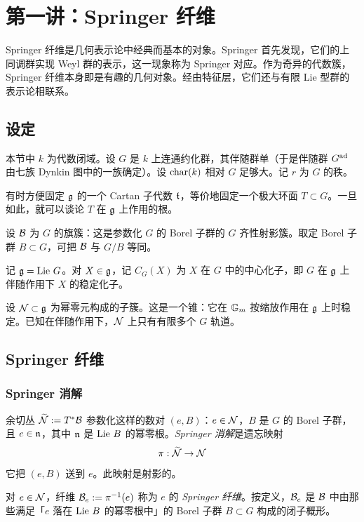 \section{第一讲：Springer 纤维}

Springer 纤维是几何表示论中经典而基本的对象。Springer \cite{Springer} 首先发现，它们的上同调群实现 Weyl 群的表示，这一现象称为 Springer 对应。作为奇异的代数簇，Springer 纤维本身即是有趣的几何对象。经由特征层，它们还与有限 Lie 型群的表示论相联系。

\subsection{设定}\label{ss:notation} 本节中 $k$ 为代数闭域。设 $G$ 是 $k$ 上连通约化群，其伴随群单（于是伴随群 $G^{\textup{ad}}$ 由七族 Dynkin 图中的一族确定）。设 $\textup{char}(k)$ 相对 $G$ 足够大。记 $r$ 为 $G$ 的秩。

有时方便固定 $\mathfrak{g}$ 的一个 Cartan 子代数 $\mathfrak{t}$，等价地固定一个极大环面 $T\subset G$。一旦如此，就可以谈论 $T$ 在 $\mathfrak{g}$ 上作用的根。

设 $\mathcal{B}$ 为 $G$ 的旗簇：这是参数化 $G$ 的 Borel 子群的 $G$ 齐性射影簇。取定 Borel 子群 $B\subset G$，可把 $\mathcal{B}$ 与 $G/B$ 等同。

记 $\mathfrak{g}=\textup{Lie}\  G$。对 $X\in\mathfrak{g}$，记 $C_{G}(X)$ 为 $X$ 在 $G$ 中的中心化子，即 $G$ 在 $\mathfrak{g}$ 上伴随作用下 $X$ 的稳定化子。

设 $\mathcal{N}\subset\mathfrak{g}$ 为幂零元构成的子簇。这是一个锥：它在 $\mathbb{G}_m$ 按缩放作用在 $\mathfrak{g}$ 上时稳定。已知在伴随作用下，$\mathcal{N}$ 上只有有限多个 $G$ 轨道。

\subsection{Springer 纤维}

\subsubsection{Springer 消解} 余切丛 $\widetilde{\mathcal{N}}:=T^{*}\mathcal{B}$ 参数化这样的数对 $(e, B)$：$e\in\mathcal{N}$，$B$ 是 $G$ 的 Borel 子群，且 $e\in \mathfrak{n}$，其中 $\mathfrak{n}$ 是 $\textup{Lie}\  B$ 的幂零根。{\em Springer 消解}是遗忘映射
\begin{equation*}
\pi:\widetilde{\mathcal{N}}\to\mathcal{N}
\end{equation*}
它把 $(e, B)$ 送到 $e$。此映射是射影的。

对 $e\in\mathcal{N}$，纤维 $\mathcal{B}_{e}:=\pi^{-1}(e)$ 称为 $e$ 的 {\em Springer 纤维}。按定义，$\mathcal{B}_{e}$ 是 $\mathcal{B}$ 中由那些满足「$e$ 落在 $\textup{Lie}\  B$ 的幂零根中」的 Borel 子群 $B\subset G$ 构成的闭子概形。

